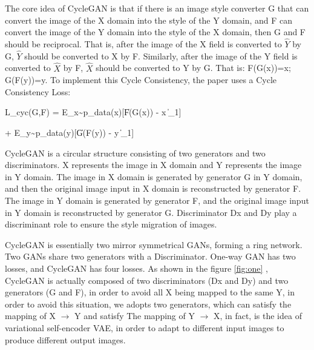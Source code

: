 \documentclass[10pt,twocolumn,letterpaper]{article}
\begin{document}
   The core idea of ​​CycleGAN is that if there is an image style converter G that 
   can convert the image of the X domain into the style of the Y  domain, 
   and F can convert the image of the Y domain into the style of the X domain, 
   then G and F should be reciprocal. That is, after the image of the X field is converted to $\hat{Y}$ by G, 
   $\hat{Y}$ should be converted to X by F. 
   Similarly, after the image of the Y field is converted to $\hat{X}$ by F, 
   $\hat{X}$ should be converted to Y by G. 
   That is: F(G(x))=x; G(F(y))=y. 
   To implement this Cycle Consistency, the paper uses a Cycle Consistency Loss\cite{CycleConsistencyLoss}:
   
   L_{cyc}(G,F) = E_{x\sim p_{data}(x)}[\left \| F(G(x)) - x \right \|_{1}]
   
   + E_{y\sim p_{data}(y)}[\left \| G(F(y)) - y \right \|_{1}] \cite{CycleGAN}
   
  
   CycleGAN is a circular structure consisting of two generators and two discriminators.
   X represents the image in X domain and Y represents the image in Y domain. 
   The image in X domain is generated by    generator G in Y domain, 
   and then the original image input in X domain is reconstructed by generator F. 
   The image in Y domain is generated by generator F, 
   and the original image input in Y domain is reconstructed by generator G. 
   Discriminator Dx and Dy play a discriminant role to ensure the style migration of images.
   
   CycleGAN is essentially two mirror symmetrical GANs\cite{GAN}, forming a ring network. 
   Two GANs share two generators with a Discriminator. One-way GAN has two losses, 
   and CycleGAN has four losses.
   As shown in the figure \ref{fig:one} , CycleGAN is actually composed of two discriminators (Dx and Dy) and two generators (G and F), 
   in order to avoid all X being mapped to the same Y,
   in order to avoid this situation, we adopts two generators, which can satisfy the mapping of X $\to$ Y and satisfy The mapping of Y $\to$ X, 
   in fact, is the idea of variational self-encoder VAE, in order to adapt to different input images to produce different output images.
   
\end{document}
